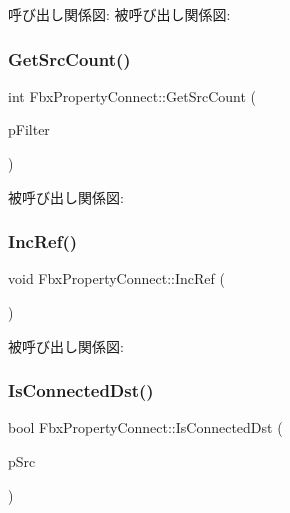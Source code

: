 呼び出し関係図\+:
被呼び出し関係図\+:
\mbox{\label{class_fbx_property_connect_a44f9ad9bc5eb7d3127a506fa8e2ea244}} 
\subsubsection{\texorpdfstring{Get\+Src\+Count()}{GetSrcCount()}}
{\footnotesize\ttfamily int Fbx\+Property\+Connect\+::\+Get\+Src\+Count (\begin{DoxyParamCaption}\item[{\hyperlink{class_fbx_connection_point_filter}{Fbx\+Connection\+Point\+Filter} $\ast$}]{p\+Filter }\end{DoxyParamCaption})}

被呼び出し関係図\+:
\mbox{\label{class_fbx_property_connect_ad1c6573c7343eab1e833824f02be39e1}} 
\subsubsection{\texorpdfstring{Inc\+Ref()}{IncRef()}}
{\footnotesize\ttfamily void Fbx\+Property\+Connect\+::\+Inc\+Ref (\begin{DoxyParamCaption}{ }\end{DoxyParamCaption})}

被呼び出し関係図\+:
\mbox{\label{class_fbx_property_connect_a3abc22f00d2507d6b1d77739a1add59d}} 
\subsubsection{\texorpdfstring{Is\+Connected\+Dst()}{IsConnectedDst()}}
{\footnotesize\ttfamily bool Fbx\+Property\+Connect\+::\+Is\+Connected\+Dst (\begin{DoxyParamCaption}\item[{\hyperlink{class_fbx_property_connect}{Fbx\+Property\+Connect} $\ast$}]{p\+Src }\end{DoxyParamCaption})}

